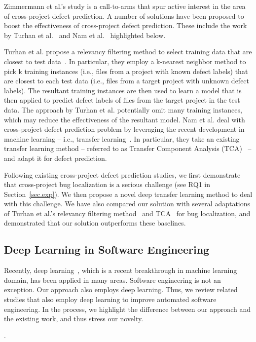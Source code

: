 Zimmermann et al.'s study is a call-to-arms that spur active interest in the area of cross-project defect prediction. A number of solutions have been proposed to boost the effectiveness of cross-project defect prediction. These include the work by Turhan et al.~\cite{TurhanMBS09} and Nam et al.~\cite{NamPK13} highlighted below. 

Turhan et al. propose a relevancy filtering method to select training data that are closest to test data~\cite{TurhanMBS09}. In particular, they employ a k-nearest neighbor method to pick k training instances (i.e., files from a project with known defect labels) that are closest to each test data (i.e., files from a target project with unknown defect labels). The resultant training instances are then used to learn a model that is then applied to predict defect labels of files from the target project in the test data. The approach by Turhan et al. potentially omit many training instances, which may reduce the effectiveness of the resultant model. Nam et al. deal with cross-project defect prediction problem by leveraging the recent development in machine learning -- i.e., transfer learning~\cite{NamPK13}. In particular, they take an existing transfer learning method -- referred to as Transfer Component Analysis (TCA)~\cite{PanTKY11} -- and adapt it for defect prediction.

Following existing cross-project defect prediction studies, we first demonstrate that cross-project bug localization is a serious challenge (see RQ1 in Section~\ref{sec.exp}). We then propose a novel deep transfer learning method to deal with this challenge. We have also compared our solution with several adaptations of Turhan et al.'s relevancy filtering method~\cite{TurhanMBS09} and TCA~\cite{PanTKY11} for bug localization, and demonstrated that our solution outperforms these baselines.


\subsection{Deep Learning in Software Engineering}\label{sec.deeplearning}

Recently, deep learning~\cite{Goodfellow-et-al-2016}, which is a recent breakthrough in machine learning domain, has been applied in many areas. Software engineering is not an exception. Our approach also employs deep learning. Thus, we review related studies that also employ deep learning to improve automated software engineering. In the process, we highlight the difference between our approach and the existing work, and thus stress our novelty.

.
